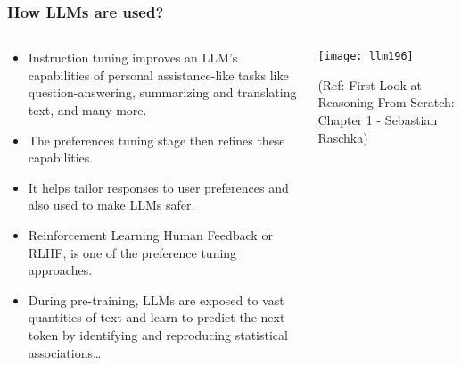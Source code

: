 \begin{frame}[fragile]\frametitle{How LLMs are used?}

\begin{columns}
    \begin{column}[T]{0.5\linewidth}
		\begin{itemize}
		  \item  Instruction tuning improves an LLM’s capabilities of personal assistance-like tasks like question-answering, summarizing and translating text, and many more. 
		  \item The preferences tuning stage then refines these capabilities. 
		  \item It helps tailor responses to user preferences and also used to make LLMs safer.
		  \item Reinforcement Learning Human Feedback or RLHF, is one of the preference tuning approaches.
		  \item During pre-training, LLMs are exposed to vast quantities of text and learn to predict the next token by identifying and reproducing statistical associations…
		\end{itemize}

    \end{column}
    \begin{column}[T]{0.5\linewidth}

		\begin{center}
		\texttt{[image: llm196]}
		
		{\tiny (Ref: First Look at Reasoning From Scratch: Chapter 1 - Sebastian Raschka)}
	
		\end{center}
    \end{column}
  \end{columns}

\end{frame}

